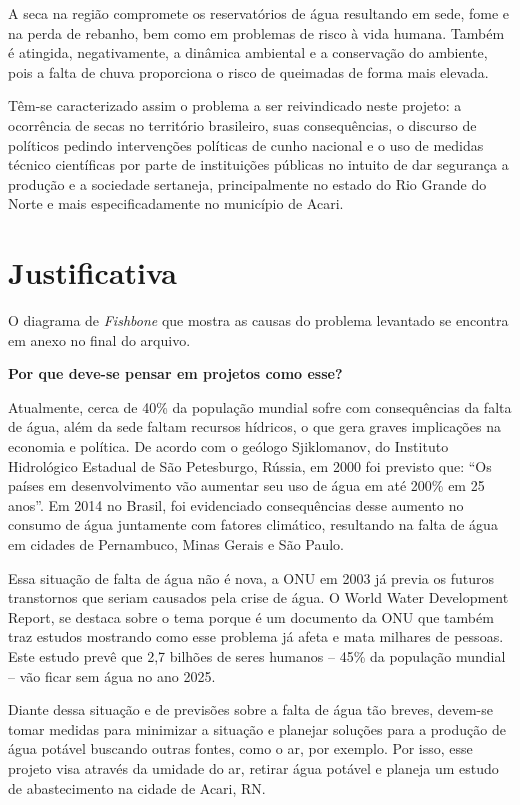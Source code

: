 A seca na região compromete os reservatórios de água resultando em sede, fome e na perda de rebanho, bem como em problemas
de risco à vida humana. Também é atingida, negativamente, a dinâmica ambiental e a conservação do ambiente, pois a falta de 
chuva proporciona o risco de queimadas de forma mais elevada.

Têm-se caracterizado assim o problema a ser reivindicado neste projeto: a ocorrência de secas no território brasileiro,
suas consequências, o discurso de políticos pedindo intervenções políticas de cunho nacional e o uso de medidas técnico 
científicas por parte de instituições públicas no intuito de dar segurança a produção e a sociedade sertaneja, principalmente 
no estado do Rio Grande do Norte e mais especificadamente no município de Acari.


\section{Justificativa}

O diagrama de \textit{Fishbone} que mostra as causas do problema levantado se encontra em anexo no final do arquivo.

\textbf{Por que deve-se pensar em projetos como esse?}

Atualmente, cerca de 40\% da população mundial sofre com consequências da falta de água, além da sede faltam recursos hídricos,
o que gera graves implicações na economia e política. De acordo com o geólogo Sjiklomanov, do Instituto Hidrológico Estadual 
de São Petesburgo, Rússia, em 2000 foi previsto que: “Os países em desenvolvimento vão aumentar seu uso de água em até 200\% em
25 anos”. Em 2014 no Brasil, foi evidenciado consequências desse aumento no consumo de água juntamente com fatores climático,
resultando na falta de água em cidades de Pernambuco, Minas Gerais e São Paulo.

Essa situação de falta de água não é nova, a ONU em 2003 já previa os futuros transtornos que seriam causados pela crise de 
água. O World Water Development Report, se destaca sobre o tema porque é um documento da ONU que também traz estudos mostrando
como esse problema já afeta e mata milhares de pessoas. Este estudo prevê que 2,7 bilhões de seres humanos – 45\% da população 
mundial – vão ficar sem água no ano 2025.

Diante dessa situação e de previsões sobre a falta de água tão breves, devem-se tomar medidas para minimizar a situação e
planejar soluções para a produção de água potável buscando outras fontes, como o ar, por exemplo. Por isso, esse projeto visa
através da umidade do ar, retirar água potável e planeja um estudo de abastecimento na cidade de Acari, RN.

